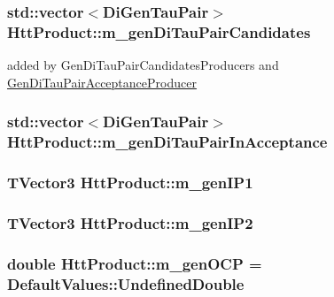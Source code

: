 \label{classHttProduct_ac16132a7c669ebff09cb300be554a4c8}
\hypertarget{classHttProduct_a0865735d27c7a69146e4edab092a4db2}{
\subsubsection[{m\_\-genDiTauPairCandidates}]{\setlength{\rightskip}{0pt plus 5cm}std::vector$<${\bf DiGenTauPair}$>$ {\bf HttProduct::m\_\-genDiTauPairCandidates}}}
\label{classHttProduct_a0865735d27c7a69146e4edab092a4db2}


added by GenDiTauPairCandidatesProducers and \hyperlink{classGenDiTauPairAcceptanceProducer}{GenDiTauPairAcceptanceProducer} \hypertarget{classHttProduct_a327e2e641fe1ed7ffdbd16b115e1dfd5}{
\subsubsection[{m\_\-genDiTauPairInAcceptance}]{\setlength{\rightskip}{0pt plus 5cm}std::vector$<${\bf DiGenTauPair}$>$ {\bf HttProduct::m\_\-genDiTauPairInAcceptance}}}
\label{classHttProduct_a327e2e641fe1ed7ffdbd16b115e1dfd5}
\hypertarget{classHttProduct_ade104eec9f075c87d0de6c816e5fd260}{
\subsubsection[{m\_\-genIP1}]{\setlength{\rightskip}{0pt plus 5cm}TVector3 {\bf HttProduct::m\_\-genIP1}}}
\label{classHttProduct_ade104eec9f075c87d0de6c816e5fd260}
\hypertarget{classHttProduct_afa86c42d8eb6accbfa740e341c837fc1}{
\subsubsection[{m\_\-genIP2}]{\setlength{\rightskip}{0pt plus 5cm}TVector3 {\bf HttProduct::m\_\-genIP2}}}
\label{classHttProduct_afa86c42d8eb6accbfa740e341c837fc1}
\hypertarget{classHttProduct_adbf6b4ae920c78e982d14c577d720ad5}{
\subsubsection[{m\_\-genOCP}]{\setlength{\rightskip}{0pt plus 5cm}double {\bf HttProduct::m\_\-genOCP} = DefaultValues::UndefinedDouble}}
